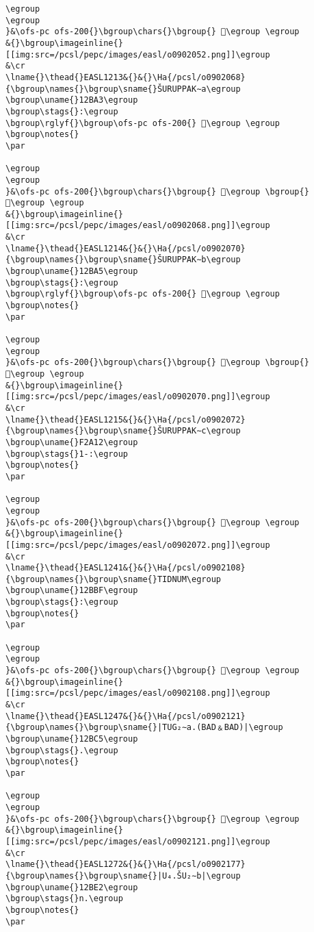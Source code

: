\begin{verbatim}
\egroup
\egroup
}&\ofs-pc ofs-200{}\bgroup\chars{}\bgroup{} 󲷼\egroup \egroup
&{}\bgroup\imageinline{}[[img:src=/pcsl/pepc/images/easl/o0902052.png]]\egroup
&\cr
\lname{}\thead{}EASL1213&{}&{}\Ha{/pcsl/o0902068}{\bgroup\names{}\bgroup\sname{}ŠURUPPAK∼a\egroup
\bgroup\uname{}12BA3\egroup
\bgroup\stags{}:\egroup
\bgroup\rglyf{}\bgroup\ofs-pc ofs-200{} 𒮣\egroup \egroup
\bgroup\notes{}
\par 

\egroup
\egroup
}&\ofs-pc ofs-200{}\bgroup\chars{}\bgroup{} 𒮢\egroup \bgroup{} 𒮣\egroup \egroup
&{}\bgroup\imageinline{}[[img:src=/pcsl/pepc/images/easl/o0902068.png]]\egroup
&\cr
\lname{}\thead{}EASL1214&{}&{}\Ha{/pcsl/o0902070}{\bgroup\names{}\bgroup\sname{}ŠURUPPAK∼b\egroup
\bgroup\uname{}12BA5\egroup
\bgroup\stags{}:\egroup
\bgroup\rglyf{}\bgroup\ofs-pc ofs-200{} 𒮥\egroup \egroup
\bgroup\notes{}
\par 

\egroup
\egroup
}&\ofs-pc ofs-200{}\bgroup\chars{}\bgroup{} 𒮤\egroup \bgroup{} 𒮥\egroup \egroup
&{}\bgroup\imageinline{}[[img:src=/pcsl/pepc/images/easl/o0902070.png]]\egroup
&\cr
\lname{}\thead{}EASL1215&{}&{}\Ha{/pcsl/o0902072}{\bgroup\names{}\bgroup\sname{}ŠURUPPAK∼c\egroup
\bgroup\uname{}F2A12\egroup
\bgroup\stags{}1-:\egroup
\bgroup\notes{}
\par 

\egroup
\egroup
}&\ofs-pc ofs-200{}\bgroup\chars{}\bgroup{} 󲨒\egroup \egroup
&{}\bgroup\imageinline{}[[img:src=/pcsl/pepc/images/easl/o0902072.png]]\egroup
&\cr
\lname{}\thead{}EASL1241&{}&{}\Ha{/pcsl/o0902108}{\bgroup\names{}\bgroup\sname{}TIDNUM\egroup
\bgroup\uname{}12BBF\egroup
\bgroup\stags{}:\egroup
\bgroup\notes{}
\par 

\egroup
\egroup
}&\ofs-pc ofs-200{}\bgroup\chars{}\bgroup{} 𒮿\egroup \egroup
&{}\bgroup\imageinline{}[[img:src=/pcsl/pepc/images/easl/o0902108.png]]\egroup
&\cr
\lname{}\thead{}EASL1247&{}&{}\Ha{/pcsl/o0902121}{\bgroup\names{}\bgroup\sname{}|TUG₂∼a.(BAD﹠BAD)|\egroup
\bgroup\uname{}12BC5\egroup
\bgroup\stags{}.\egroup
\bgroup\notes{}
\par 

\egroup
\egroup
}&\ofs-pc ofs-200{}\bgroup\chars{}\bgroup{} 𒯅\egroup \egroup
&{}\bgroup\imageinline{}[[img:src=/pcsl/pepc/images/easl/o0902121.png]]\egroup
&\cr
\lname{}\thead{}EASL1272&{}&{}\Ha{/pcsl/o0902177}{\bgroup\names{}\bgroup\sname{}|U₄.ŠU₂∼b|\egroup
\bgroup\uname{}12BE2\egroup
\bgroup\stags{}n.\egroup
\bgroup\notes{}
\par 


\end{verbatim}
